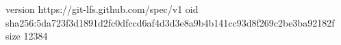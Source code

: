 version https://git-lfs.github.com/spec/v1
oid sha256:5da723f3d1891d2fc0dfccd6af4d3d3e8a9b4b141cc93d8f269c2be3ba92182f
size 12384
